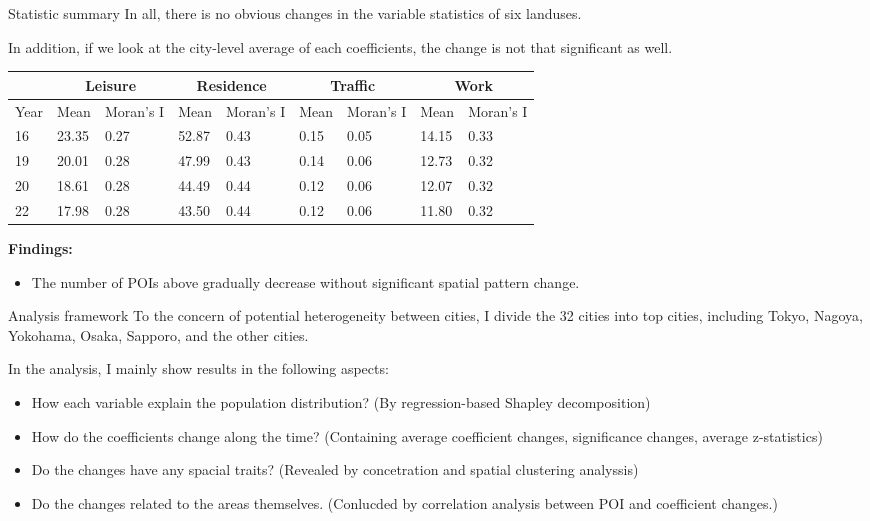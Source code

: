\documentclass[aspectratio=169,xcolor=dvipsnames]{beamer}
\begin{document}
\begin{frame}{Statistic summary}
	In all, there is no obvious changes in the variable statistics of six landuses.\par 
	In addition, if we look at the city-level average of each coefficients, the change is not that significant as well.
	\small
\begin{table}[]
	\begin{tabular}{l|ll|ll|ll|ll}\toprule
		& \multicolumn{2}{c|}{Leisure} & \multicolumn{2}{c|}{Residence} & \multicolumn{2}{c|}{Traffic} & \multicolumn{2}{c}{Work} \\\midrule
		Year & Mean       & Moran's I      & Mean            & Moran's I           & Mean       & Moran's I      & Mean      & Moran's I    \\\hline 
		16   & 23.35      & 0.27           & 52.87           & 0.43                & 0.15       & 0.05           & 14.15     & 0.33         \\
		19   & 20.01      & 0.28           & 47.99           & 0.43                & 0.14       & 0.06           & 12.73     & 0.32         \\
		20   & 18.61      & 0.28           & 44.49           & 0.44                & 0.12       & 0.06           & 12.07     & 0.32         \\
		22   & 17.98      & 0.28           & 43.50           & 0.44                & 0.12       & 0.06           & 11.80     & 0.32        \\\bottomrule
	\end{tabular}
\end{table}
\normalsize
{\textbf{Findings:}}\\
\begin{itemize}
	\item 
	The number of POIs above gradually decrease without significant spatial pattern change.
\end{itemize}
\end{frame}
\begin{frame}{Analysis framework}
To the concern of potential heterogeneity between cities, I divide the 32 cities into top cities, including Tokyo, Nagoya, Yokohama, Osaka, Sapporo, and the other cities.\par 
	In the analysis, I mainly show results in the following aspects:
\begin{itemize}
	\item How each variable explain the population distribution? (By regression-based Shapley decomposition)
	\item How do the coefficients change along the time? (Containing average coefficient changes, significance changes, average z-statistics)
	\item Do the changes have any spacial traits? (Revealed by concetration and spatial clustering analyssis)
	\item Do the changes related to the areas themselves. (Conlucded by correlation analysis between POI and coefficient changes.)
\end{itemize}
\end{frame}
\end{document}

